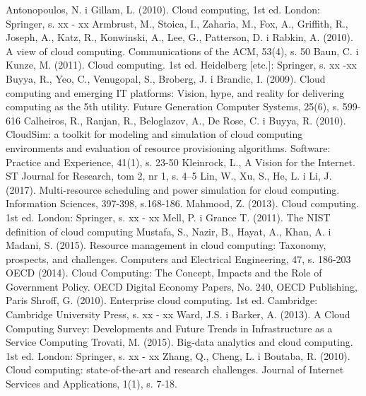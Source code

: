 \documentclass[12pt,a4paper,twoside]{article}
\begin{document}
\clearpage

\begin{thebibliography}{99}
\setlength{\itemsep}{0pt}%
 Antonopoulos, N. i Gillam, L. (2010). Cloud computing, 1st ed. London: Springer, s. xx - xx
 Armbrust, M., Stoica, I., Zaharia, M., Fox, A., Griffith, R., Joseph, A., Katz, R., Konwinski, A., Lee, G., Patterson, D. i Rabkin, A. (2010). A view of cloud computing. Communications of the ACM, 53(4), s. 50
 Baun, C. i Kunze, M. (2011). Cloud computing. 1st ed. Heidelberg [etc.]: Springer, s. xx -xx
 Buyya, R., Yeo, C., Venugopal, S., Broberg, J. i Brandic, I. (2009). Cloud computing and emerging IT platforms: Vision, hype, and reality for delivering computing as the 5th utility. Future Generation Computer Systems, 25(6), s. 599-616
 Calheiros, R., Ranjan, R., Beloglazov, A., De Rose, C. i Buyya, R. (2010). CloudSim: a toolkit for modeling and simulation of cloud computing environments and evaluation of resource provisioning algorithms. Software: Practice and Experience, 41(1), s. 23-50
 Kleinrock, L., A Vision for the Internet. ST Journal for Research, tom 2, nr 1, s. 4–5
 Lin, W., Xu, S., He, L. i Li, J. (2017). Multi-resource scheduling and power simulation for cloud computing. Information Sciences, 397-398, s.168-186.
 Mahmood, Z. (2013). Cloud computing. 1st ed. London: Springer, s. xx - xx
 Mell, P. i Grance T. (2011). The NIST definition of cloud computing
 Mustafa, S., Nazir, B., Hayat, A., Khan, A. i Madani, S. (2015). Resource management in cloud computing: Taxonomy, prospects, and challenges. Computers and Electrical Engineering, 47, s. 186-203
 OECD (2014). Cloud Computing: The Concept, Impacts and the Role of Government Policy. OECD Digital Economy Papers, No. 240, OECD Publishing, Paris
 Shroff, G. (2010). Enterprise cloud computing. 1st ed. Cambridge: Cambridge University Press, s. xx - xx
 Ward, J.S. i Barker, A. (2013). A Cloud Computing Survey: Developments and Future Trends in Infrastructure as a Service Computing
 Trovati, M. (2015). Big-data analytics and cloud computing. 1st ed. London: Springer, s. xx - xx
 Zhang, Q., Cheng, L. i Boutaba, R. (2010). Cloud computing: state-of-the-art and research challenges. Journal of Internet Services and Applications, 1(1), s. 7-18.

\end{thebibliography}
\clearpage

\listoffigures

\clearpage

\listoftables

\clearpage
\end{document}
